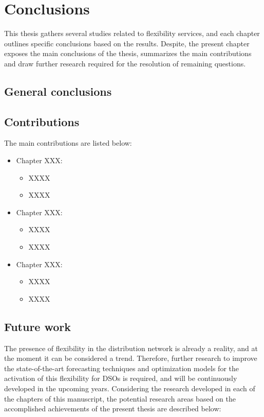 
    \chapter{Conclusions}
    \label{conclus}
    This thesis gathers several studies related to flexibility services, and each chapter outlines specific conclusions based on the results. Despite, the present chapter exposes the main conclusions of the thesis, summarizes the main contributions and draw further research required for the resolution of remaining questions. 

\section{General conclusions}
	
    
     
\section{Contributions}
The main contributions are listed below: 
\begin{itemize}
\item Chapter XXX: 
	\begin{itemize}
		\item XXXX
		\item XXXX
	\end{itemize}
\item Chapter XXX: 
	\begin{itemize}
		\item XXXX
		\item XXXX
	\end{itemize}
\item Chapter XXX: 
	\begin{itemize}
		\item XXXX
		\item XXXX
	\end{itemize}
\end{itemize}
	


\section{Future work}
The presence of flexibility in the distribution network is already a reality, and at the moment it can be considered a trend. Therefore, further research to improve the state-of-the-art forecasting techniques and optimization models for the activation of this flexibility for DSOs is required, and will be continuously developed in the upcoming years. 
Considering the research developed in each of the chapters of this manuscript, the potential research areas based on the accomplished achievements of the present thesis are described below: 

